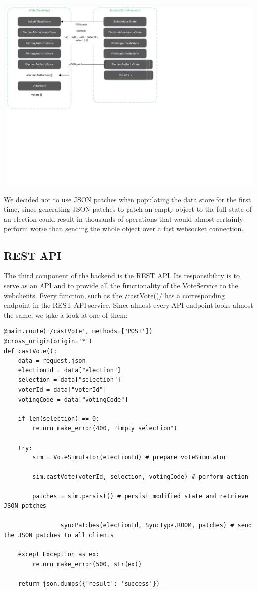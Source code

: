 \begin{center}
\includegraphics[scale=0.62]{assets/datastores_jsonpatch.pdf}
\label{Data-Sync with JSON Patches}%
\end{center}
We decided not to use JSON patches when populating the data store for the first time, since generating JSON patches to patch an empty object to the full state of an election could result in thousands of operations that would almost certainly perform worse than sending the whole object over a fast websocket connection.

\subsection{REST API}
The third component of the backend is the REST API. Its responsibility is to serve as an API and to provide all the functionality of the VoteService to the webclients. Every function, such as the \texttt/castVote()/ has a corresponding endpoint in the REST API service. Since almost every API endpoint looks almost the same, we take a look at one of them:

\begin{verbatim}
@main.route('/castVote', methods=['POST'])
@cross_origin(origin='*')
def castVote():
    data = request.json
    electionId = data["election"]
    selection = data["selection"]
    voterId = data["voterId"]
    votingCode = data["votingCode"]

    if len(selection) == 0:
        return make_error(400, "Empty selection")

    try:        
        sim = VoteSimulator(electionId) # prepare voteSimulator
        
        sim.castVote(voterId, selection, votingCode) # perform action
        
        patches = sim.persist()	# persist modified state and retrieve JSON patches
        
				syncPatches(electionId, SyncType.ROOM, patches)	# send the JSON patches to all clients

    except Exception as ex:
        return make_error(500, str(ex))

    return json.dumps({'result': 'success'})
\end{verbatim}

